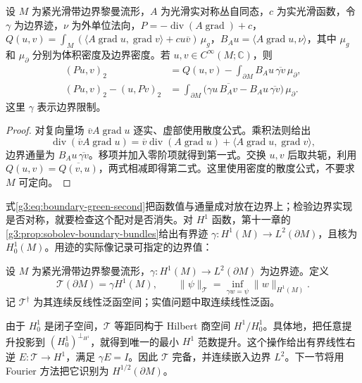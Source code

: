 \begin{proposition}\label{g3:prop:boundary-green-identities}
	设 \(M\) 为紧光滑带边界黎曼流形，\(A\) 为光滑实对称丛自同态，\(c\) 为实光滑函数，令 \(\gamma\) 为边界迹，\(\nu\) 为外单位法向，\(P=-\operatorname{div}(A\operatorname{grad})+c\)，\(Q(u,v)=\int_M(\langle A\operatorname{grad}u,\operatorname{grad}v\rangle+cu\overline v)\,\mu_g\)，\(B_Au=\langle A\operatorname{grad}u,\nu\rangle\)，其中 \(\mu_g\) 和 \(\mu_\partial\) 分别为体积密度及边界密度。若 \(u,v\in C^\infty(M;\mathbb C)\)，则
	\begin{align}
		(Pu,v)_2&=Q(u,v)-\int_{\partial M}B_Au\,\overline{\gamma v}\,\mu_{\partial},
		\label{g3:eq:boundary-green-first}\\
		(Pu,v)_2-(u,Pv)_2
		&=\int_{\partial M}\bigl(\gamma u\,\overline{B_Av}
		-B_Au\,\overline{\gamma v}\bigr)\,\mu_{\partial}.
		\label{g3:eq:boundary-green-second}
	\end{align}
	这里 \(\gamma\) 表示边界限制。
\end{proposition}
\begin{proof}
	对复向量场 \(\overline v A\operatorname{grad}u\) 逐实、虚部使用散度公式。乘积法则给出
	\[
		\operatorname{div}(\overline v A\operatorname{grad}u)
		=\overline v\operatorname{div}(A\operatorname{grad}u)
		+\langle A\operatorname{grad}u,\operatorname{grad}v\rangle,
	\]
	边界通量为 \(B_Au\,\overline{\gamma v}\)。移项并加入零阶项就得到第一式。交换 \(u,v\) 后取共轭，利用 \(Q(u,v)=\overline{Q(v,u)}\)，两式相减即得第二式。这里使用密度的散度公式，不要求 \(M\) 可定向。
\end{proof}

式\eqref{g3:eq:boundary-green-second}把函数值与通量成对放在边界上；检验边界实现是否对称，就要检查这个配对是否消失。对 \(H^1\) 函数，第十一章的\cref{g3:prop:sobolev-boundary-bundles}给出有界迹 \(\gamma:H^1(M)\to L^2(\partial M)\)，且核为 \(H_0^1(M)\)。用迹的实际像记录可指定的边界值：
\begin{definition}\label{g3:def:trace-range-space}
	设 \(M\) 为紧光滑带边界黎曼流形，\(\gamma:H^1(M)\to L^2(\partial M)\) 为边界迹。定义
	\[
		\mathcal T(\partial M)=\gamma H^1(M),\qquad
		\|\psi\|_{\mathcal T}=\inf_{\gamma w=\psi}\|w\|_{H^1(M)}.
	\]
	记 \(\mathcal T^\dagger\) 为其连续反线性泛函空间；实值问题中取连续线性泛函。
\end{definition}
由于 \(H_0^1\) 是闭子空间，\(\mathcal T\) 等距同构于 Hilbert 商空间 \(H^1/H_0^1\)。具体地，把任意提升投影到 \((H_0^1)^{\perp_{H^1}}\)，就得到唯一的最小 \(H^1\) 范数提升。这个操作给出有界线性右逆 \(E:\mathcal T\to H^1\)，满足 \(\gamma E=I\)。因此 \(\mathcal T\) 完备，并连续嵌入边界 \(L^2\)。下一节将用 Fourier 方法把它识别为 \(H^{1/2}(\partial M)\)。

